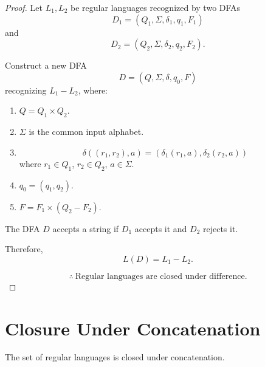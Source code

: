 \documentclass[11pt]{scrreprt}
\begin{document}
\begin{proof}
    Let $L_1, L_2$ be regular languages recognized by two DFAs
    \[
        D_1 = (Q_1, \Sigma, \delta_1, q_1, F_1)
    \]
    and
    \[
        D_2 = (Q_2, \Sigma, \delta_2, q_2, F_2).
    \]

    Construct a new DFA
    \[
        D = (Q, \Sigma, \delta, q_0, F)
    \]
    recognizing $L_1 - L_2$, where:

    \begin{enumerate}
        \item $Q = Q_1 \times Q_2$.

        \item $\Sigma$ is the common input alphabet.

        \item
        \[
            \delta((r_1,r_2),a)
            =
            (\delta_1(r_1,a),\delta_2(r_2,a))
        \]
        where $r_1 \in Q_1$, $r_2 \in Q_2$,
        $a \in \Sigma$.

        \item $q_0 = (q_1,q_2)$.

        \item $F = F_1 \times (Q_2 - F_2)$.
    \end{enumerate}

    The DFA $D$ accepts a string if $D_1$ accepts it
    and $D_2$ rejects it.

    Therefore,
    \[
        L(D) = L_1 - L_2.
    \]

    \[
        \boxed{
            \therefore\ \text{Regular languages are closed under difference.}
        }
    \]
\end{proof}

\section{Closure Under Concatenation}

\begin{theorem*}
    The set of regular languages is closed under concatenation.
\end{theorem*}
\end{document}
